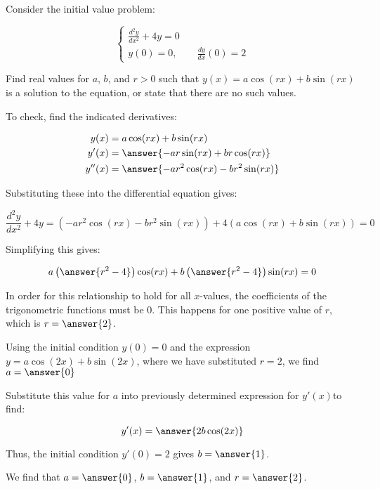 \documentclass{ximera}
\author{Jim Talamo}
\begin{document}
\begin{exercise}
Consider the initial value problem:

\[\left\{
\begin{array}{l}
\frac{d^2y}{dx^2} + 4y = 0 \\ 
y(0) = 0 , \qquad \frac{dy}{dx}(0) =2
\end{array}
\right.\]
 
 Find real values for $a$, $b$, and $r>0$ such that $y(x) = a \cos(rx)+b\sin(rx)$ is a solution to the equation, or state that there are no such values.

\begin{multipleChoice}
\end{multipleChoice}
\begin{hint}
To check, find the indicated derivatives:

\begin{align*}
y(x) & =  a \cos(rx)+b\sin(rx) \\
y'(x) &= \answer{ -a r \sin(rx)+br\cos(rx)} \\
y''(x) &= \answer{ -a r^2 \cos(rx)-br^2\sin(rx)} \\
\end{align*}

\begin{question}
Substituting these into the differential equation gives: 

\[ \frac{d^2y}{dx^2} + 4y = (-a r^2 \cos(rx)-br^2\sin(rx)) + 4(a \cos(rx)+b\sin(rx))= 0\]

Simplifying this gives:

\[  a \left( \answer{r^2-4} \right) \cos(rx) +b\left(\answer{r^2-4}\right) \sin(rx) = 0 \]

In order for this relationship to hold for all $x$-values, the coefficients of the trigonometric functions must be $0$.  This happens for one positive value of $r$, which is $r=\answer{2}$.

\begin{question}
Using the initial condition $y(0)=0$ and the expression $y=a \cos(2x)+b\sin(2x)$, where we have substituted $r=2$, we find $a=\answer{0}$

Substitute this value for $a$ into previously determined expression for $y'(x)$to find:

\[
y'(x) = \answer{2b\cos(2x)}
\] 

Thus, the initial condition $y'(0) =2$ gives $b=\answer{1}$.
\end{question}

\end{question}
\end{hint}
We find that $a=\answer{0}$, $b=\answer{1}$, and $r=\answer{2}$.
\end{exercise}
\end{document}
